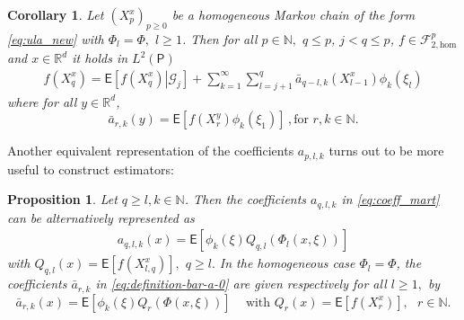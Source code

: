 \documentclass[bj]{imsart}
\def\nset{\mathbb{N}}
\def\rset{\mathbb{R}}
\def\rset{\mathbb{R}}
\newtheorem{prop}[thm]{Proposition}
\newtheorem{cor}[thm]{Corollary}
\begin{document}
\begin{cor}
Let \((X^x_{p})_{p\geq 0}\) be a homogeneous Markov chain of the form \eqref{eq:ula_new} with $\Phi_l = \Phi,$ $l\geq 1$. Then for all $p \in \nset,$ $q \leq p$, $j < q \leq p$, $f \in \mathcal{F}_{2,\text{hom}}^p$ and $x \in \rset^d$ it holds in \(L^2(\mathsf{P})\)
\begin{eqnarray*}
f(X^x_{q})=\mathsf{E}\left[\left.f(X^x_{q})\right|\mathcal G_{j}\right]+\sum_{k=1}^{\infty}\sum_{l=j+1}^{q}\bar a_{q-l,k}(X^x_{l-1})\phi_k\left(\xi_{l}\right)
\end{eqnarray*}
where for all $y \in \rset^d$,
\begin{equation}
\label{eq:definition-bar-a-0}
\bar a_{r,k}(y)=\mathsf{E}\left[f(X^y_{r})\phi_k\left(\xi_{1}\right)\right] \,, \text{for $r, k\in \mathbb{N}$.}
\end{equation}
\end{cor}
Another equivalent representation of the coefficients \(a_{p,l,k}\)  turns out to be more useful to construct estimators:
\begin{prop}
Let $q\geq l, k\in \nset$. Then the coefficients \(a_{q,l,k}\) in \eqref{eq:coeff_mart}  can be alternatively represented as
\begin{eqnarray*}
a_{q,l,k}(x)=\mathsf{E}\left[\phi_k\left(\xi\right)Q_{q,l}\left(\Phi_l(x,\xi)\right)\right]
\end{eqnarray*}
with \(Q_{q,l}(x)=\mathsf{E}\left[f(X^x_{l,q})\right],\) \(q\geq l.\)
In the homogeneous case $\Phi_l=\Phi$, the coefficients $\bar{a}_{r,k}$ in \eqref{eq:definition-bar-a-0} are given respectively  for all $l\geq 1,$ by
\begin{equation}
\label{eq:definition-bar-a}
\bar a_{r,k}(x)=\mathsf{E}\left[\phi_k\left(\xi\right)Q_{r}\left(\Phi(x,\xi)\right)\right] \,
\quad \text{with  \(Q_{r}(x)=\mathsf{E}\left[f(X^x_{r})\right],\) $r\in \mathbb{N}.$}
\end{equation}
\end{prop}
\end{document}
